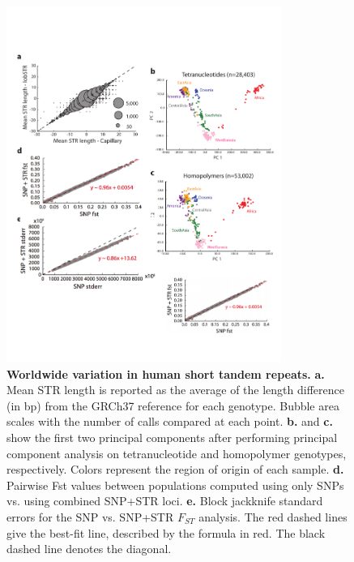 \begin{figure}[h!]
\centering
\label{fig:sgdped}
\includegraphics[width=0.8\textwidth]{Figures/App3/FigED.pdf}
\caption{\textbf{Worldwide variation in human short tandem repeats.} \textbf{a.} Mean STR length is reported as the average of the length difference (in bp) from the GRCh37 reference for each genotype. Bubble area scales with the number of calls compared at each point. \textbf{b.} and \textbf{c.} show the first two principal components after performing principal component analysis on tetranucleotide and homopolymer genotypes, respectively. Colors represent the region of origin of each sample. \textbf{d.} Pairwise Fst values between populations computed using only SNPs vs. using combined SNP+STR loci. \textbf{e.} Block jackknife standard errors for the SNP vs. SNP+STR $F_{ST}$ analysis. The red dashed lines give the best-fit line, described by the formula in red. The black dashed line denotes the diagonal.}
\end{figure}

